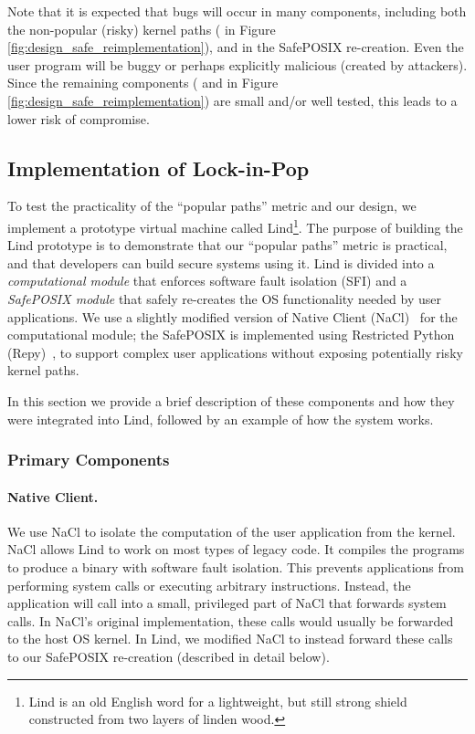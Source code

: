 Note that it is expected that bugs will occur in many components, including both the
non-popular (risky) kernel paths ( in Figure \ref{fig:design_safe_reimplementation}),
and in the SafePOSIX re-creation. Even the user program will be buggy or
perhaps explicitly malicious (created by attackers).
Since the remaining components ( and  in Figure \ref{fig:design_safe_reimplementation})
are small and/or well tested, this leads to a lower risk of compromise.

\subsection{Implementation of Lock-in-Pop}
\label{implementation}

To test the practicality of the ``popular paths'' metric and our \lip design,
we implement a prototype virtual machine
called Lind\footnote{\scriptsize Lind is an old English word for a lightweight,
but still strong shield constructed from two layers of linden wood.}. The purpose of building the Lind
prototype is to demonstrate that our ``popular paths'' metric is practical, and
that developers can build secure systems using it.
Lind is divided into a \emph{computational module} that enforces software fault isolation (SFI) and a
\emph{SafePOSIX module} that safely re-creates the OS functionality needed by user
applications.  We use a slightly modified version of Native Client
(NaCl)~\cite{NaCl-09} for the computational module; the SafePOSIX is
implemented using Restricted Python (Repy)~\cite{Repy-10}, to support
complex user applications without exposing potentially risky kernel paths.

In this section we provide a brief description of these components and how they
were integrated into Lind, followed by an example of how the system works.

\subsubsection{Primary Components}

\paragraph{Native Client.}
We use NaCl to isolate the computation of the user application
from the kernel. NaCl allows Lind to work on most types of legacy code.
It compiles the programs to produce a binary with software fault isolation.
This prevents applications from performing system calls
or executing arbitrary instructions.
Instead, the application will call into a small, privileged
part of NaCl that forwards system calls. In NaCl's original implementation,
these calls would usually be forwarded to the host OS kernel. In Lind, we
modified NaCl to instead forward these calls to our SafePOSIX re-creation
(described in detail below).

